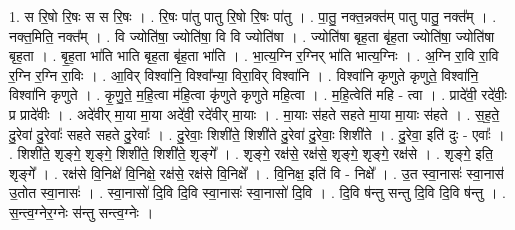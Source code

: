 \documentclass[17pt]{extarticle}
\begin{document}
1. स रि॒षो रि॒षः स स रि॒षः । . रि॒षः पा॑तु पातु रि॒षो रि॒षः पा॑तु । . पा॒तु॒ नक्त॒न्नक्त॑म् पातु पातु॒ नक्त᳚म् । . नक्त॒मिति॒ नक्त᳚म् । . वि ज्योति॑षा॒ ज्योति॑षा॒ वि वि ज्योति॑षा । . ज्योति॑षा बृह॒ता बृ॑ह॒ता ज्योति॑षा॒ ज्योति॑षा बृह॒ता । . बृ॒ह॒ता भा॑ति भाति बृह॒ता बृ॑ह॒ता भा॑ति । . भा॒त्य॒ग्नि र॒ग्निर् भा॑ति भात्य॒ग्निः । . अ॒ग्नि रा॒वि रा॒वि र॒ग्नि र॒ग्नि रा॒विः । . आ॒विर् विश्वा॑नि॒ विश्वा᳚न्या॒ विरा॒विर् विश्वा॑नि । . विश्वा॑नि कृणुते कृणुते॒ विश्वा॑नि॒ विश्वा॑नि कृणुते । . कृ॒णु॒ते॒ म॒हि॒त्वा म॑हि॒त्वा कृ॑णुते कृणुते महि॒त्वा । . म॒हि॒त्वेति॑ महि - त्वा । . प्रादे॑वी॒ रदे॑वीः॒ प्र प्रादे॑वीः । . अदे॑वीर् मा॒या मा॒या अदे॑वी॒ रदे॑वीर् मा॒याः । . मा॒याः स॑हते सहते मा॒या मा॒याः स॑हते । . स॒ह॒ते॒ दु॒रेवा॑ दु॒रेवाः᳚ सहते सहते दु॒रेवाः᳚ । . दु॒रेवाः॒ शिशी॑ते॒ शिशी॑ते दु॒रेवा॑ दु॒रेवाः॒ शिशी॑ते । . दु॒रेवा॒ इति॑ दुः - एवाः᳚ । . शिशी॑ते॒ शृङ्गे॒ शृङ्गे॒ शिशी॑ते॒ शिशी॑ते॒ शृङ्गे᳚ । . शृङ्गे॒ रक्ष॑से॒ रक्ष॑से॒ शृङ्गे॒ शृङ्गे॒ रक्ष॑से । . शृङ्गे॒ इति॒ शृङ्गे᳚ । . रक्ष॑से वि॒निक्षे॑ वि॒निक्षे॒ रक्ष॑से॒ रक्ष॑से वि॒निक्षे᳚ । . वि॒निक्ष॒ इति॑ वि - निक्षे᳚ । . उ॒त स्वा॒नासः॑ स्वा॒नास॑ उ॒तोत स्वा॒नासः॑ । . स्वा॒नासो॑ दि॒वि दि॒वि स्वा॒नासः॑ स्वा॒नासो॑ दि॒वि । . दि॒वि ष॑न्तु सन्तु दि॒वि दि॒वि ष॑न्तु । . स॒न्त्व॒ग्नेर॒ग्नेः स॑न्तु सन्त्व॒ग्नेः । \newline
\end{document}
